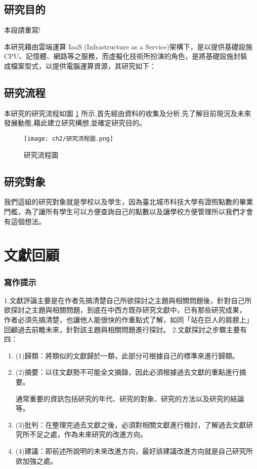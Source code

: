  \section{研究目的}

本段請重寫!

本研究藉由雲端運算 IaaS (Infrastructure as a Service)架構下，是以提供基礎設施CPU、記憶體、網路等之服務，而虛擬化技術所扮演的角色，是將基礎設施封裝成檔案型式，以提供電腦運算資源，其研究如下：

  \section{研究流程}
本研究的研究流程如圖 \ref{fig:研究流程圖} 所示,首先經由資料的收集及分析,先了解目前現況及未來發展動態,藉此建立研究構想,並確定研究目的。

\begin{figure}[h]
\centering \texttt{[image: ch2/研究流程圖.png]}
\caption{\label{fig:研究流程圖}研究流程圖}
\end{figure}

  \section{研究對象}
我們這組的研究對象就是學校以及學生，因為臺北城市科技大學有證照點數的畢業門檻，為了讓所有學生可以方便查詢自己的點數以及讓學校方便管理所以我們才會有這個想法。

\chapter{文獻回顧}

\subsection{寫作提示} 
1.文獻評論主要是在作者先搞清楚自己所欲探討之主題與相關問題後，針對自己所
欲探討之主題與相關問題，到底在中西方既存研究文獻中，已有那些研究成果，
作者必須先搞清楚，也讓他人能很快的作重點式了解，如同「站在巨人的肩膀上」
回顧過去前瞻未來，針對該主題與相關問題進行探討。
2.文獻探討之步驟主要有四：
\begin{enumerate}[noitemsep]
\item (1)歸類：將類似的文獻歸於一類，此部分可根據自己的標準來進行歸類。
\item (2)摘要：以往文獻勢不可能全文摘錄，因此必須根據過去文獻的重點進行摘要。

通常重要的資訊包括研究的年代、研究的對象、研究的方法以及研究的結論等。
\item (3)批判：在整理完過去文獻之後，必須對相關文獻進行檢討，了解過去文獻研究所不足之處，作為未來研究的改進方向。
\item (4)建議：即前述所說明的未來改進方向，最好該建議改進方向就是自己研究所欲加強之處。
\end{enumerate}

